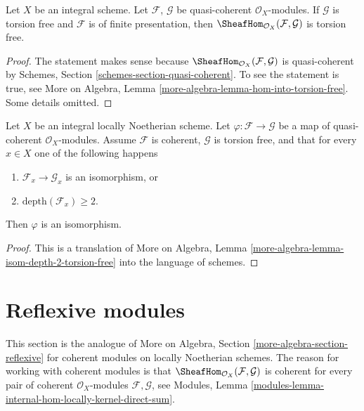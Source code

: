 \begin{lemma}
\label{lemma-hom-into-torsion-free}
Let $X$ be an integral scheme. Let $\mathcal{F}$, $\mathcal{G}$ be
quasi-coherent $\mathcal{O}_X$-modules.
If $\mathcal{G}$ is torsion free and $\mathcal{F}$ is of finite presentation,
then $\SheafHom_{\mathcal{O}_X}(\mathcal{F}, \mathcal{G})$ is torsion free.
\end{lemma}

\begin{proof}
The statement makes sense because
$\SheafHom_{\mathcal{O}_X}(\mathcal{F}, \mathcal{G})$
is quasi-coherent by Schemes, Section \ref{schemes-section-quasi-coherent}.
To see the statement is true, see
More on Algebra, Lemma \ref{more-algebra-lemma-hom-into-torsion-free}.
Some details omitted.
\end{proof}

\begin{lemma}
\label{lemma-isom-depth-2-torsion-free}
Let $X$ be an integral locally Noetherian scheme. Let
$\varphi : \mathcal{F} \to \mathcal{G}$ be a map of
quasi-coherent $\mathcal{O}_X$-modules. Assume $\mathcal{F}$ is coherent,
$\mathcal{G}$ is torsion free, and that for every $x \in X$ one of the
following happens
\begin{enumerate}
\item $\mathcal{F}_x \to \mathcal{G}_x$ is an isomorphism, or
\item $\text{depth}(\mathcal{F}_x) \geq 2$.
\end{enumerate}
Then $\varphi$ is an isomorphism.
\end{lemma}

\begin{proof}
This is a translation of More on Algebra, Lemma
\ref{more-algebra-lemma-isom-depth-2-torsion-free}
into the language of schemes.
\end{proof}








\section{Reflexive modules}
\label{section-reflexive}

\noindent
This section is the analogue of
More on Algebra, Section \ref{more-algebra-section-reflexive}
for coherent modules on locally Noetherian schemes. The reason for
working with coherent modules is that
$\SheafHom_{\mathcal{O}_X}(\mathcal{F}, \mathcal{G})$ is coherent
for every pair of coherent $\mathcal{O}_X$-modules $\mathcal{F}, \mathcal{G}$,
see Modules, Lemma \ref{modules-lemma-internal-hom-locally-kernel-direct-sum}.


